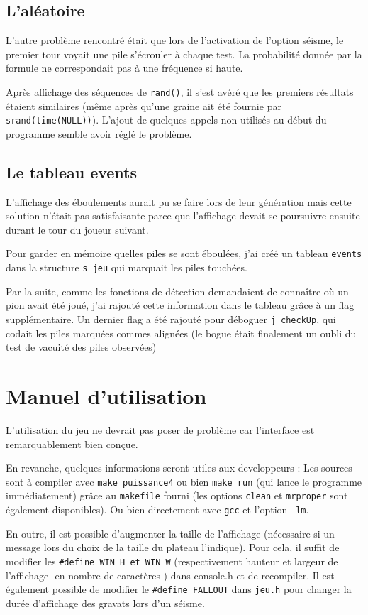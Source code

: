 \documentclass[a4paper, titlepage]{article}
\begin{document}
\subsection{L'aléatoire}
L'autre problème rencontré était que lors de l'activation de l'option séisme, le premier tour voyait une pile s'écrouler à chaque test. La probabilité donnée par la formule ne correspondait pas à une fréquence si haute.

Après affichage des séquences de \texttt{rand()}, il s'est avéré que les premiers résultats étaient similaires (même après qu'une graine ait été fournie par \texttt{srand(time(NULL))}). L'ajout de quelques appels non utilisés au début du programme semble avoir réglé le problème.

\subsection{Le tableau events}
L'affichage des éboulements aurait pu se faire lors de leur génération mais cette solution n'était pas satisfaisante parce que l'affichage devait se poursuivre ensuite durant le tour du joueur suivant.

Pour garder en mémoire quelles piles se sont éboulées, j'ai créé un tableau \texttt{events} dans la structure \texttt{s\_jeu} qui marquait les piles touchées.

Par la suite, comme les fonctions de détection demandaient de connaître où un pion avait été joué, j'ai rajouté cette information dans le tableau  grâce à un flag supplémentaire. Un dernier flag a été rajouté pour déboguer \texttt{j\_checkUp}, qui codait les piles marquées commes alignées (le bogue était finalement un oubli du test de vacuité des piles observées)

\section{Manuel d'utilisation}
L'utilisation du jeu ne devrait pas poser de problème car l'interface est remarquablement bien conçue.

En revanche, quelques informations seront utiles aux developpeurs : 
Les sources sont à compiler avec \texttt{make puissance4} ou bien \texttt{make run} (qui lance le programme immédiatement) grâce au \texttt{makefile} fourni (les options \texttt{clean} et \texttt{mrproper} sont également disponibles).
Ou bien directement avec \texttt{gcc} et l'option \texttt{-lm}.

En outre, il est possible d'augmenter la taille de l'affichage (nécessaire si un message lors du choix de la taille du plateau l'indique). Pour cela, il suffit de modifier les \texttt{\#define WIN\_H et WIN\_W} (respectivement hauteur et largeur de l'affichage -en nombre de caractères-) dans console.h et de recompiler. Il est également possible de modifier le \texttt{\#define FALLOUT} dans \texttt{jeu.h} pour changer la durée d'affichage des gravats lors d'un séisme.
\end{document}
